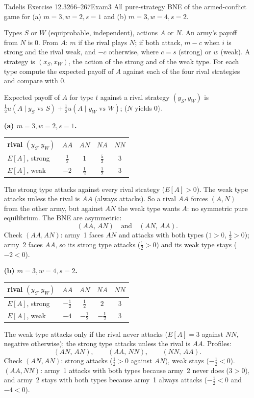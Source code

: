 \begin{exsol}{Tadelis Exercise 12.3}{266--267}{Exam}{3}
\asked All pure-strategy BNE of the armed-conflict game for (a) $m=3,w=2,s=1$ and (b) $m=3,w=4,s=2$.

\method Types $S$ or $W$ (equiprobable, independent), actions $A$ or $N$. An army's payoff from
$N$ is $0$. From $A$: $m$ if the rival plays $N$; if both attack, $m-c$ when $i$ is strong and the
rival weak, and $-c$ otherwise, where $c=s$ (strong) or $w$ (weak). A strategy is
$(x_S,x_W)$, the action of the strong and of the weak type. For each type compute the expected
payoff of $A$ against each of the four rival strategies and compare with $0$.

\solution
Expected payoff of $A$ for type $t$ against a rival strategy $(y_S,y_W)$ is
$\tfrac12 u(A\mid y_S\text{ vs }S)+\tfrac12 u(A\mid y_W\text{ vs }W)$; ($N$ yields $0$).

\textbf{(a) $m=3,w=2,s=1$.}
\begin{center}\small
\begin{tabular}{l|cccc}
rival $(y_S,y_W)$ & $AA$ & $AN$ & $NA$ & $NN$\\\hline
$E[A]$, strong & $\tfrac12$ & $1$ & $\tfrac52$ & $3$\\
$E[A]$, weak & $-2$ & $\tfrac12$ & $\tfrac12$ & $3$
\end{tabular}
\end{center}
The strong type attacks against every rival strategy ($E[A]>0$). The weak type attacks unless the
rival is $AA$ (always attacks). So a rival $AA$ forces $(A,N)$ from the other army, but against
$AN$ the weak type wants $A$: no symmetric pure equilibrium. The BNE are asymmetric:
\[
  (AA,\,AN)\quad\text{and}\quad(AN,\,AA).
\]
Check $(AA,AN)$: army~1 faces $AN$ and attacks with both types ($1>0$, $\tfrac12>0$); army~2 faces
$AA$, so its strong type attacks ($\tfrac12>0$) and its weak type stays ($-2<0$).

\textbf{(b) $m=3,w=4,s=2$.}
\begin{center}\small
\begin{tabular}{l|cccc}
rival $(y_S,y_W)$ & $AA$ & $AN$ & $NA$ & $NN$\\\hline
$E[A]$, strong & $-\tfrac12$ & $\tfrac12$ & $2$ & $3$\\
$E[A]$, weak & $-4$ & $-\tfrac12$ & $-\tfrac12$ & $3$
\end{tabular}
\end{center}
The weak type attacks only if the rival never attacks ($E[A]=3$ against $NN$, negative otherwise);
the strong type attacks unless the rival is $AA$. Profiles:
\[
  (AN,\,AN),\qquad (AA,\,NN),\qquad (NN,\,AA).
\]
Check $(AN,AN)$: strong attacks ($\tfrac12>0$ against $AN$), weak stays ($-\tfrac12<0$). $(AA,NN)$:
army~1 attacks with both types because army~2 never does ($3>0$), and army~2 stays with both types
because army~1 always attacks ($-\tfrac12<0$ and $-4<0$).


\end{exsol}
